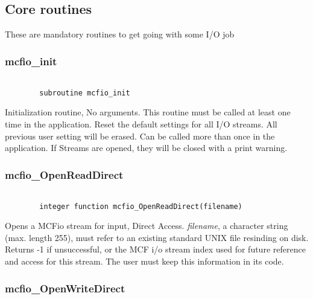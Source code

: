 \subsection{Core routines}

	These are mandatory routines to get going with some I/O job 

\subsubsection{mcfio\_init}
\begin{verbatim}

        subroutine mcfio_init

\end{verbatim}
 Initialization routine, No arguments.  This routine must be called at  least
 one time in the application. Reset the default settings for all I/O streams. 
 All previous user setting will be  erased.   Can be called more than once in
 the application.   If Streams are opened, they will be closed with a print
 warning. 

\subsubsection{mcfio\_OpenReadDirect}
\begin{verbatim}

        integer function mcfio_OpenReadDirect(filename)

\end{verbatim}
 Opens a MCFio  stream for input, Direct Access. {\em filename}, a  character
 string (max. length 255), must refer to an existing standard UNIX file
 resinding  on disk. Returns -1 if unsuccessful, or the MCF i/o stream index 
 used for future reference and access for this stream. The user must keep
 this information in its code. 
 
\subsubsection{mcfio\_OpenWriteDirect}

